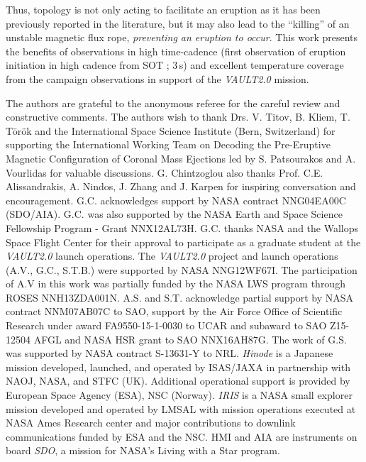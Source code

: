 \documentclass[preprint]{aastex}
\begin{document}
Thus, topology is not only acting to facilitate an eruption as it has been previously reported in the literature, but it may also lead to the ``killing'' of an unstable magnetic flux rope, \emph{preventing an eruption to occur}. This work presents the benefits of observations in high time-cadence (first observation of eruption initiation in high cadence from SOT ; 3\,s) and excellent temperature coverage from the campaign observations in support of the \textit{VAULT2.0} mission.

\acknowledgments
The authors are grateful to the anonymous referee for the careful review and constructive comments. The authors wish to thank Drs. V. Titov, B. Kliem, T. T\"{o}r\"{o}k and the International Space Science Institute (Bern, Switzerland) for supporting the International Working Team on Decoding the Pre-Eruptive Magnetic Configuration of Coronal Mass Ejections led by S. Patsourakos and A. Vourlidas for valuable discussions. G. Chintzoglou also thanks Prof. C.E. Alissandrakis, A. Nindos, J. Zhang and J. Karpen for inspiring conversation and encouragement. G.C. acknowledges support by NASA contract NNG04EA00C (SDO/AIA). G.C. was also supported by the NASA Earth and Space Science Fellowship Program - Grant NNX12AL73H. G.C. thanks NASA and the Wallops Space Flight Center for their approval to participate as a graduate student at the \emph{VAULT2.0} launch operations. The \textit{VAULT2.0} project and launch operations (A.V., G.C., S.T.B.) were supported by NASA NNG12WF67I. The participation of A.V in this work was partially funded by the NASA LWS program through ROSES NNH13ZDA001N. A.S. and S.T. acknowledge partial support by NASA contract NNM07AB07C to SAO, support by the Air Force Office of Scientific Research under award FA9550-15-1-0030 to UCAR and subaward to SAO Z15-12504 AFGL and NASA HSR grant to SAO NNX16AH87G. The work of G.S. was supported by NASA contract S-13631-Y to NRL. {\it Hinode} is a Japanese mission developed, launched, and operated by ISAS/JAXA in partnership with NAOJ, NASA, and STFC (UK). Additional operational support is provided by European Space Agency (ESA), NSC (Norway). \emph{IRIS} is a NASA small explorer mission developed and operated by LMSAL with mission operations executed at NASA Ames Research center and major contributions to downlink communications funded by ESA and the NSC. HMI and AIA are instruments on board \emph{SDO}, a mission for NASA's Living with a Star program. 


\end{document}
